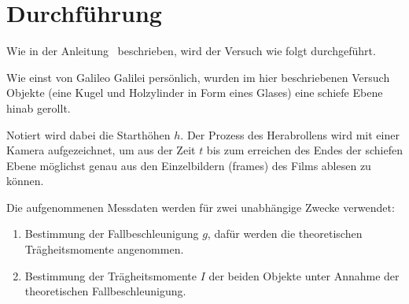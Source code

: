 \section{Durchführung}
\label{sec:Durchführung}

Wie in der Anleitung~\cite{V16516} beschrieben, wird der Versuch wie folgt durchgeführt.

Wie einst von Galileo Galilei \cite[232]{galilei1623} persönlich, wurden im hier beschriebenen Versuch
Objekte (eine Kugel und  Holzylinder in Form eines Glases) eine schiefe Ebene hinab gerollt.

Notiert wird dabei die Starthöhen $h$. Der Prozess des Herabrollens wird mit einer Kamera 
aufgezeichnet, um aus der Zeit $t$ bis zum erreichen des Endes der schiefen Ebene möglichst genau
aus den Einzelbildern (frames) des Films ablesen zu können.

Die aufgenommenen Messdaten werden für zwei unabhängige Zwecke verwendet:

\begin{enumerate}
  \item {Bestimmung der Fallbeschleunigung $g$, dafür werden 
        die theoretischen Trägheitsmomente angenommen.}
      \item {Bestimmung der Trägheitsmomente $I$ der beiden Objekte unter Annahme der theoretischen 
        Fallbeschleunigung.}
\end{enumerate}


